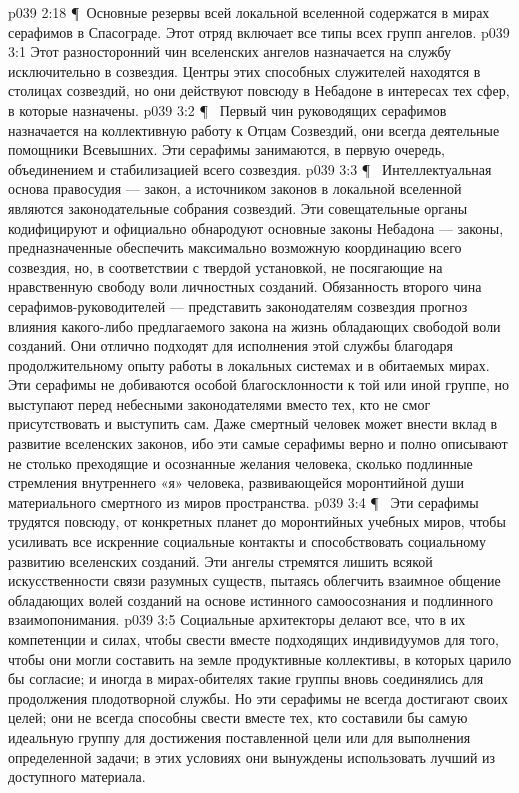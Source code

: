\vs p039 2:18 \P\ Основные резервы всей локальной вселенной содержатся в мирах серафимов в Спасограде. Этот отряд включает все типы всех групп ангелов.
\vs p039 3:1 Этот разносторонний чин вселенских ангелов назначается на службу исключительно в созвездия. Центры этих способных служителей находятся в столицах созвездий, но они действуют повсюду в Небадоне в интересах тех сфер, в которые назначены.
\vs p039 3:2 \P\ \bibnobreakspace {} Первый чин руководящих серафимов назначается на коллективную работу к Отцам Созвездий, они всегда деятельные помощники Всевышних. Эти серафимы занимаются, в первую очередь, объединением и стабилизацией всего созвездия.
\vs p039 3:3 \P\ \bibnobreakspace {} Интеллектуальная основа правосудия --- закон, а источником законов в локальной вселенной являются законодательные собрания созвездий. Эти совещательные органы кодифицируют и официально обнародуют основные законы Небадона --- законы, предназначенные обеспечить максимально возможную координацию всего созвездия, но, в соответствии с твердой установкой, не посягающие на нравственную свободу воли личностных созданий. Обязанность второго чина серафимов\hyp{}руководителей --- представить законодателям созвездия прогноз влияния какого\hyp{}либо предлагаемого закона на жизнь обладающих свободой воли созданий. Они отлично подходят для исполнения этой службы благодаря продолжительному опыту работы в локальных системах и в обитаемых мирах. Эти серафимы не добиваются особой благосклонности к той или иной группе, но выступают перед небесными законодателями вместо тех, кто не смог присутствовать и выступить сам. Даже смертный человек может внести вклад в развитие вселенских законов, ибо эти самые серафимы верно и полно описывают не столько преходящие и осознанные желания человека, сколько подлинные стремления внутреннего «я» человека, развивающейся моронтийной души материального смертного из миров пространства.
\vs p039 3:4 \P\ \bibnobreakspace {} Эти серафимы трудятся повсюду, от конкретных планет до моронтийных учебных миров, чтобы усиливать все искренние социальные контакты и способствовать социальному развитию вселенских созданий. Эти ангелы стремятся лишить всякой искусственности связи разумных существ, пытаясь облегчить взаимное общение обладающих волей созданий на основе истинного самоосознания и подлинного взаимопонимания.
\vs p039 3:5 Социальные архитекторы делают все, что в их компетенции и силах, чтобы свести вместе подходящих индивидуумов для того, чтобы они могли составить на земле продуктивные коллективы, в которых царило бы согласие; и иногда в мирах\hyp{}обителях такие группы вновь соединялись для продолжения плодотворной службы. Но эти серафимы не всегда достигают своих целей; они не всегда способны свести вместе тех, кто составили бы самую идеальную группу для достижения поставленной цели или для выполнения определенной задачи; в этих условиях они вынуждены использовать лучший из доступного материала.
